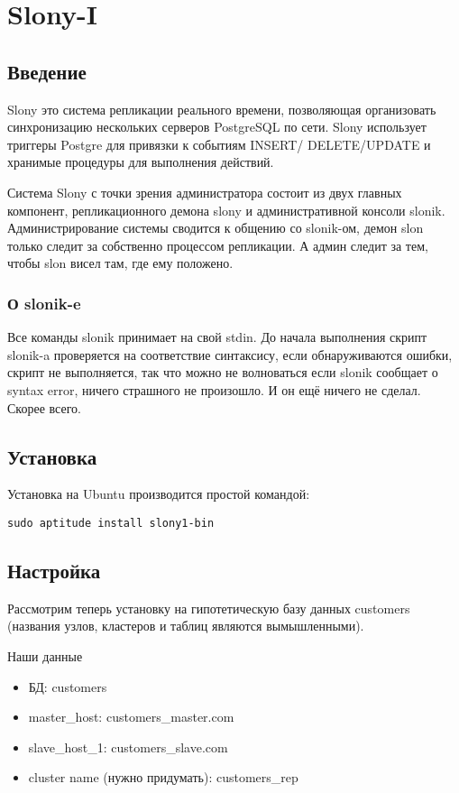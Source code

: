 \section{Slony-I}
\subsection{Введение}
Slony это система репликации реального времени, позволяющая организовать синхронизацию нескольких серверов 
PostgreSQL по сети. Slony использует триггеры Postgre для привязки к событиям INSERT/ DELETE/UPDATE и 
хранимые процедуры для выполнения действий.

Система Slony с точки зрения администратора состоит из двух главных компонент, репликационного демона slony и 
административной консоли slonik. Администрирование системы сводится к общению со slonik-ом, демон slon только 
следит за собственно процессом репликации. А админ следит за тем, чтобы slon висел там, где ему положено. 

\subsubsection{О slonik-e}
Все команды slonik принимает на свой stdin. До начала выполнения скрипт slonik-a проверяется на соответствие синтаксису, 
если обнаруживаются ошибки, скрипт не выполняется, так что можно не волноваться если slonik сообщает о syntax error, 
ничего страшного не произошло. И он ещё ничего не сделал. Скорее всего. 

\subsection{Установка}
Установка на Ubuntu производится простой командой:
\begin{verbatim}
sudo aptitude install slony1-bin
\end{verbatim}

\subsection{Настройка}
\label{sec:slonyI}
Рассмотрим теперь установку на гипотетическую базу данных customers 
(названия узлов, кластеров и таблиц являются вымышленными).

Наши данные
\begin{itemize}
\item БД: customers
\item master\_host: customers\_master.com
\item slave\_host\_1: customers\_slave.com
\item cluster name (нужно придумать): customers\_rep
\end{itemize}

